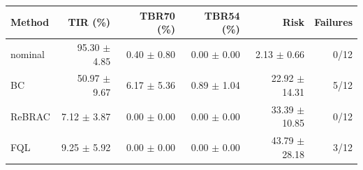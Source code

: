 \begin{tabular}{lrrrrr}
\hline
Method & TIR (\%) & TBR70 (\%) & TBR54 (\%) & Risk & Failures \\
\hline
nominal & 95.30 $\pm$ 4.85 & 0.40 $\pm$ 0.80 & 0.00 $\pm$ 0.00 & 2.13 $\pm$ 0.66 & 0/12 \\
BC & 50.97 $\pm$ 9.67 & 6.17 $\pm$ 5.36 & 0.89 $\pm$ 1.04 & 22.92 $\pm$ 14.31 & 5/12 \\
ReBRAC & 7.12 $\pm$ 3.87 & 0.00 $\pm$ 0.00 & 0.00 $\pm$ 0.00 & 33.39 $\pm$ 10.85 & 0/12 \\
FQL & 9.25 $\pm$ 5.92 & 0.00 $\pm$ 0.00 & 0.00 $\pm$ 0.00 & 43.79 $\pm$ 28.18 & 3/12 \\
\hline
\end{tabular}
